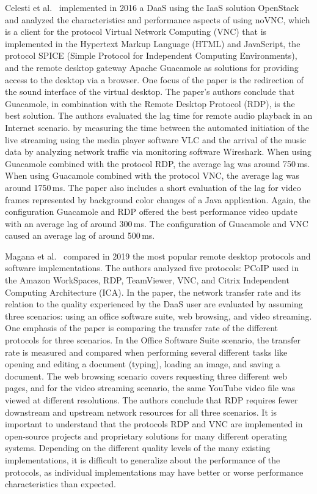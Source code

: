 \documentclass[runningheads]{llncs}
\begin{document}
Celesti et al.~\cite{celesti2016improving} implemented in 2016 a DaaS using the IaaS solution OpenStack~\cite{sefraoui2012openstack} and analyzed the characteristics and performance aspects of using noVNC, which is a client for the protocol Virtual Network Computing (VNC) that is implemented in the Hypertext Markup Language (HTML) and JavaScript, the protocol SPICE (Simple Protocol for Independent Computing Environments), and the remote desktop gateway Apache Guacamole as solutions for providing access to the desktop via a browser. One focus of the paper is the redirection of the sound interface of the virtual desktop. The paper's authors conclude that Guacamole, in combination with the Remote Desktop Protocol (RDP), is the best solution. The authors evaluated the lag time for remote audio playback in an Internet scenario. by measuring the time between the automated initiation of the live streaming using the media player software VLC and the arrival of the music data by analyzing network traffic via monitoring software Wireshark. When using Guacamole combined with the protocol RDP, the average lag was around 750\,ms. When using Guacamole combined with the protocol VNC, the average lag was around 1750\,ms. The paper also includes a short evaluation of the lag for video frames represented by background color changes of a Java application. Again, the configuration Guacamole and RDP offered the best performance video update with an average lag of around 300\,ms. The configuration of Guacamole and VNC caused an average lag of around 500\,ms.

Magana et al.~\cite{magana2019remote} compared in 2019 the most popular remote desktop protocols and software implementations. The authors analyzed five protocols: PCoIP used in the Amazon WorkSpaces, RDP, TeamViewer, VNC, and Citrix Independent Computing Architecture (ICA). In the paper, the network transfer rate and its relation to the quality experienced by the DaaS user are evaluated by assuming three scenarios: using an office software suite, web browsing, and video streaming. One emphasis of the paper is comparing the transfer rate of the different protocols for three scenarios. In the Office Software Suite scenario, the transfer rate is measured and compared when performing several different tasks like opening and editing a document (typing), loading an image, and saving a document. The web browsing scenario covers requesting three different web pages, and for the video streaming scenario, the same YouTube video file was viewed at different resolutions. The authors conclude that RDP requires fewer downstream and upstream network resources for all three scenarios. It is important to understand that the protocols RDP and VNC are implemented in open-source projects and proprietary solutions for many different operating systems. Depending on the different quality levels of the many existing implementations, it is difficult to generalize about the performance of the protocols, as individual implementations may have better or worse performance characteristics than expected.
\end{document}
